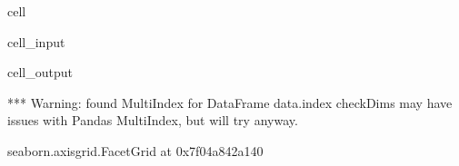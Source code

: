 \documentclass[letterpaper,table,10pt,english]{jupyterBook}
\begin{document}
\begin{sphinxuseclass}{cell}\begin{sphinxVerbatimInput}

\begin{sphinxuseclass}{cell_input}
\begin{sphinxVerbatim}[commandchars=\\\{\}]
  
     
                 
                     
\end{sphinxVerbatim}

\end{sphinxuseclass}\end{sphinxVerbatimInput}
\begin{sphinxVerbatimOutput}

\begin{sphinxuseclass}{cell_output}
\begin{sphinxVerbatim}[commandchars=\\\{\}]
*** Warning: found MultiIndex for DataFrame data.index \PYGZhy{} checkDims may have issues with Pandas MultiIndex, but will try anyway.
\end{sphinxVerbatim}

\begin{sphinxVerbatim}[commandchars=\\\{\}]
\PYGZlt{}seaborn.axisgrid.FacetGrid at 0x7f04a842a140\PYGZgt{}
\end{sphinxVerbatim}

\noindent{}

\end{sphinxuseclass}\end{sphinxVerbatimOutput}

\end{sphinxuseclass}
\end{document}
